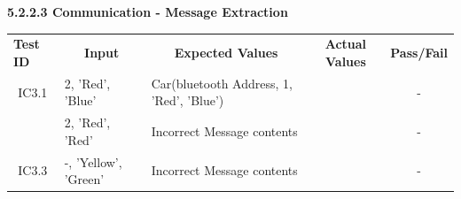 \documentclass [10pt]{article}
\begin{document}
     \textbf{5.2.2.3 Communication - Message Extraction} \vspace{2mm}
 \begin{longtable}{ |p{ }  |   p{ } | p{ } | p{ } |  p{ } |}  \hline

    \rowcolor{subsectionC}\textbf{Test ID}
    & \multicolumn{1}{c|}{\textbf{Input} }
    & \multicolumn{1}{c|}{\textbf{Expected Values} }
    & \multicolumn{1}{c|}{\textbf{Actual Values} }
    & \multicolumn{1}{c|}{\textbf{Pass/Fail}} \\  
    
       \multicolumn{1}{|c|}{IC3.1} 
    & 2, 'Red', 'Blue'
    & Car(bluetooth Address, 1, 'Red', 'Blue') 
    &  
    & \multicolumn{1}{c|}{-}\\
    
    
    \rowcolor{tableCell}\multicolumn{1}{|c|}{IC3.2} 
    & 2, 'Red', 'Red'
    & Incorrect Message contents
    &  
    & \multicolumn{1}{c|}{-}\\ 
    
    \multicolumn{1}{|c|}{IC3.3} 
    & -, 'Yellow', 'Green'
    & Incorrect Message contents
    &  
    & \multicolumn{1}{c|}{-}\\ \hline
    
    \end{longtable}
    
\end{document}
